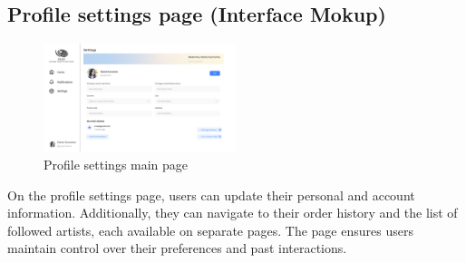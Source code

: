 \subsection{Profile settings page (Interface Mokup)}
\begin{figure}[H]
    \centering
    \includegraphics[width=0.5\textwidth]{images/interface_mockups/Profile settings - main page.pdf}
    \caption{Profile settings main page}
\end{figure}

On the profile settings page, users can update their personal and account information. Additionally, they can navigate to their order history and the list of followed artists, each available on separate pages. The page ensures users maintain control over their preferences and past interactions.

